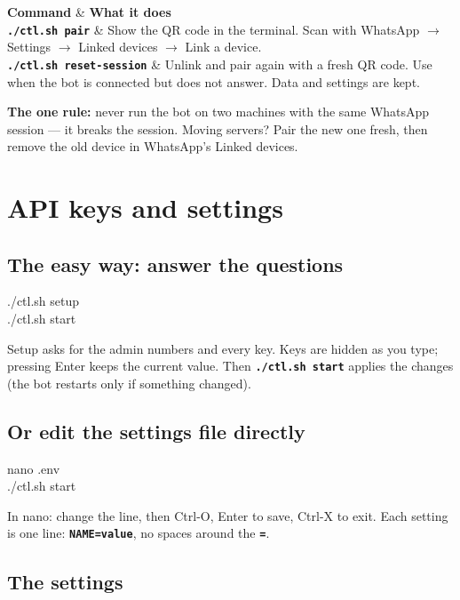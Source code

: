 \documentclass[11pt,a4paper]{article}
\makeatletter
\newcommand{\cmd}[1]{\texttt{\textbf{#1}}}
\newenvironment{commands}{%
  \renewcommand{\arraystretch}{1.35}%
  \tabularx{\textwidth}{@{}>{\raggedright\arraybackslash}p{5.6cm}X@{}}\toprule
  \textbf{Command} & \textbf{What it does} \\\midrule}
  {\bottomrule\endtabularx}
\newcommand{\shell}[1]{\begin{tcolorbox}[colback=black!85,colframe=black!85,coltext=white,boxrule=0pt,arc=2pt,left=6pt,top=3pt,bottom=3pt]\ttfamily #1\end{tcolorbox}}
\makeatother
\begin{document}
\begin{commands}
\cmd{./ctl.sh pair} & Show the QR code in the terminal. Scan with WhatsApp $\rightarrow$ Settings $\rightarrow$ Linked devices $\rightarrow$ Link a device. \\
\cmd{./ctl.sh reset-session} & Unlink and pair again with a fresh QR code. Use when the bot is connected but does not answer. Data and settings are kept. \\
\end{commands}

\begin{tip}
\textbf{The one rule:} never run the bot on two machines with the same WhatsApp session --- it breaks the session. Moving servers? Pair the new one fresh, then remove the old device in WhatsApp's Linked devices.
\end{tip}

\section{API keys and settings}

\subsection{The easy way: answer the questions}

\shell{./ctl.sh setup \\ ./ctl.sh start}

Setup asks for the admin numbers and every key. Keys are hidden as you type; pressing Enter keeps the current value. Then \cmd{./ctl.sh start} applies the changes (the bot restarts only if something changed).

\subsection{Or edit the settings file directly}

\shell{nano .env \\ ./ctl.sh start}

In nano: change the line, then Ctrl-O, Enter to save, Ctrl-X to exit. Each setting is one line: \cmd{NAME=value}, no spaces around the \cmd{=}.

\subsection{The settings}
\end{document}

